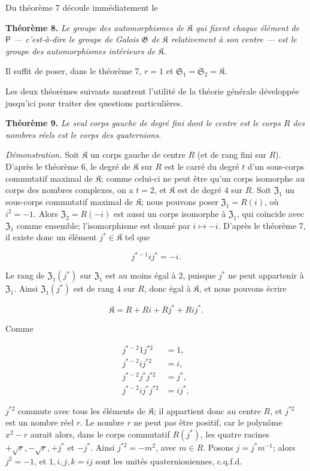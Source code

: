 Du théorème 7 découle immédiatement le

\textbf{Théorème 8.} \emph{Le groupe des automorphismes de \(\mathfrak K\) qui fixent chaque élément de \(\mathsf P\) --- c'est-à-dire le groupe de Galois \(\mathfrak G\) de \(\mathfrak K\) relativement à son centre --- est le groupe des automorphismes intérieurs de \(\mathfrak K\).}

Il suffit de poser, dans le théorème 7, \(r=1\) et \(\mathfrak S_1=\mathfrak S_2=\mathfrak K\).

Les deux théorèmes suivants montrent l'utilité de la théorie générale développée jusqu'ici pour traiter des questions particulières.

\textbf{Théorème 9.} \emph{Le seul corps gauche de degré fini dont le centre est le corps \(R\) des nombres réels est le corps des quaternions.}

\emph{Démonstration.} Soit \(\mathfrak K\) un corps gauche de centre \(R\) (et de rang fini sur \(R\)). D'après le théorème 6, le degré de \(\mathfrak K\) sur \(R\) est le carré du degré \(t\) d'un sous-corps commutatif maximal de \(\mathfrak K\); comme celui-ci ne peut être qu'un corps isomorphe au corps des nombres complexes, on a \(t=2\), et \(\mathfrak K\) est de degré \(4\) sur \(R\). Soit \(\mathfrak Z_1\) un sous-corps commutatif maximal de \(\mathfrak K\); nous pouvons poser \(\mathfrak Z_1=R(i)\), où \(i^2=-1\). Alors \(\mathfrak Z_2=R(-i)\) est aussi un corps isomorphe à \(\mathfrak Z_1\), qui coïncide avec \(\mathfrak Z_1\) comme ensemble; l'isomorphisme est donné par \(i\mapsto-i\). D'après le théorème 7, il existe donc un élément \(j^*\in\mathfrak K\) tel que

\[
j^{*-1}ij^*=-i.
\]

Le rang de \(\mathfrak Z_1(j^*)\) sur \(\mathfrak Z_1\) est au moins égal à \(2\), puisque \(j^*\) ne peut appartenir à \(\mathfrak Z_1\). Ainsi \(\mathfrak Z_1(j^*)\) est de rang \(4\) sur \(R\), donc égal à \(\mathfrak K\), et nous pouvons écrire

\[
\mathfrak K=R+Ri+Rj^*+Rij^*.
\]

Comme

\[
\begin{aligned}
j^{*-2}1j^{*2}&=1,\\
j^{*-2}ij^{*2}&=i,\\
j^{*-2}j^*j^{*2}&=j^*,\\
j^{*-2}ij^*j^{*2}&=ij^*,
\end{aligned}
\]

\(j^{*2}\) commute avec tous les éléments de \(\mathfrak K\); il appartient donc au centre \(R\), et \(j^{*2}\) est un nombre réel \(r\). Le nombre \(r\) ne peut pas être positif, car le polynôme \(x^2-r\) aurait alors, dans le corps commutatif \(R(j^*)\), les quatre racines \(+\sqrt r,-\sqrt r,+j^*\) et \(-j^*\). Ainsi \(j^{*2}=-m^2\), avec \(m\in R\). Posons \(j=j^*m^{-1}\); alors \(j^2=-1\), et \(1,i,j,k=ij\) sont les unités quaternioniennes, c.q.f.d.


